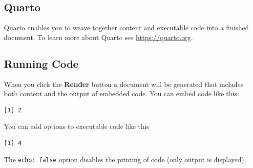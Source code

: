 \documentclass[
]{article}
\begin{document}
\subsection{Quarto}\label{quarto}

Quarto enables you to weave together content and executable code into a
finished document. To learn more about Quarto see
\url{https://quarto.org}.

\subsection{Running Code}\label{running-code}

When you click the \textbf{Render} button a document will be generated
that includes both content and the output of embedded code. You can
embed code like this:

\begin{verbatim}
[1] 2
\end{verbatim}

You can add options to executable code like this

\begin{verbatim}
[1] 4
\end{verbatim}

The \texttt{echo:\ false} option disables the printing of code (only
output is displayed).
\end{document}

